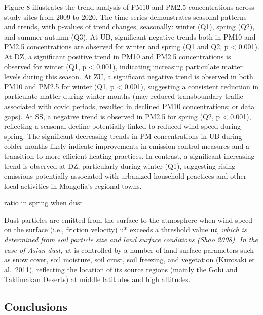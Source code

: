 \documentclass[
  11pt,
]{article}
\begin{document}
Figure 8 illustrates the trend analysis of PM10 and PM2.5 concentrations
across study sites from 2009 to 2020. The time series demonstrates
seasonal patterns and trends, with p-values of trend changes,
seasonally: winter (Q1), spring (Q2), and summer-autumn (Q3). At UB,
significant negative trends both in PM10 and PM2.5 concentrations are
observed for winter and spring (Q1 and Q2, p \textless{} 0.001). At DZ,
a significant positive trend in PM10 and PM2.5 concentrations is
observed for winter (Q1, p \textless{} 0.001), indicating increasing
particulate matter levels during this season. At ZU, a significant
negative trend is observed in both PM10 and PM2.5 for winter (Q1, p
\textless{} 0.001), suggesting a consistent reduction in particulate
matter during winter months (may reduced transboundary traffic
associated with covid periods, resulted in declined PM10 concentrations;
or data gaps). At SS, a negative trend is observed in PM2.5 for spring
(Q2, p \textless{} 0.001), reflecting a seasonal decline potentially
linked to reduced wind speed during spring. The significant decreasing
trends in PM concentrations in UB during colder months likely indicate
improvements in emission control measures and a transition to more
efficient heating practices. In contrast, a significant increasing trend
is observed at DZ, particularly during winter (Q1), suggesting rising
emissions potentially associated with urbanized household practices and
other local activities in Mongolia's regional towns.

ratio in spring when dust

Dust particles are emitted from the surface to the atmosphere when wind
speed on the surface (i.e., friction velocity) u* exceeds a threshold
value u\emph{t, which is determined from soil particle size and land
surface conditions (Shao 2008). In the case of Asian dust, u}t is
controlled by a number of land surface parameters such as snow cover,
soil moisture, soil crust, soil freezing, and vegetation (Kurosaki et
al.~2011), reflecting the location of its source regions (mainly the
Gobi and Taklimakan Deserts) at middle latitudes and high altitudes.

\subsection{Conclusions}\label{conclusions}
\end{document}
